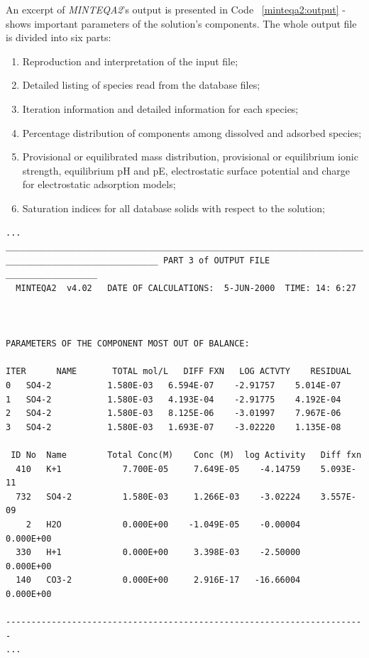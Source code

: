An excerpt of \emph{MINTEQA2}'s output is presented in Code ~\ref{minteqa2:output} - shows important parameters of the solution's components. The whole output file is divided into six parts:
\begin{enumerate}
\item Reproduction and interpretation of the input file;
\item Detailed listing of species read from the database files;
\item Iteration information and detailed information for each species;
\item Percentage distribution of components among dissolved and adsorbed species;
\item Provisional or equilibrated mass distribution, provisional or equilibrium ionic strength, equilibrium pH and pE, electrostatic surface potential and charge for electrostatic adsorption models;
\item Saturation indices for all database solids with respect to the solution;
\end{enumerate}


\begin{minipage}[c]{0.92\textwidth}
\begin{lstlisting}[frame=single, caption=\emph{MINTEQA2}'s excerpt from the output file, label=minteqa2:output]
...
_______________________________________________________________________
______________________________ PART 3 of OUTPUT FILE __________________
  MINTEQA2  v4.02   DATE OF CALCULATIONS:  5-JUN-2000  TIME: 14: 6:27



PARAMETERS OF THE COMPONENT MOST OUT OF BALANCE:

ITER      NAME       TOTAL mol/L   DIFF FXN   LOG ACTVTY    RESIDUAL
0   SO4-2           1.580E-03   6.594E-07    -2.91757    5.014E-07
1   SO4-2           1.580E-03   4.193E-04    -2.91775    4.192E-04
2   SO4-2           1.580E-03   8.125E-06    -3.01997    7.967E-06
3   SO4-2           1.580E-03   1.693E-07    -3.02220    1.135E-08

 ID No  Name        Total Conc(M)    Conc (M)  log Activity   Diff fxn
  410   K+1            7.700E-05     7.649E-05    -4.14759    5.093E-11
  732   SO4-2          1.580E-03     1.266E-03    -3.02224    3.557E-09
    2   H2O            0.000E+00    -1.049E-05    -0.00004    0.000E+00
  330   H+1            0.000E+00     3.398E-03    -2.50000    0.000E+00
  140   CO3-2          0.000E+00     2.916E-17   -16.66004    0.000E+00

-----------------------------------------------------------------------
...
\end{lstlisting}
\end{minipage}

